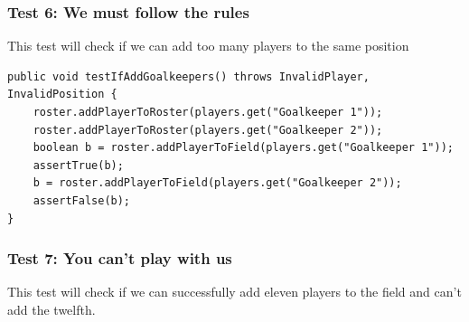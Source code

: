 \documentclass{article}
\begin{document}
\subsubsection{Test 6: We must follow the rules}
This test will check if we can add too many players to the same position
\begin{lstlisting}
public void testIfAddGoalkeepers() throws InvalidPlayer, InvalidPosition {
	roster.addPlayerToRoster(players.get("Goalkeeper 1"));
	roster.addPlayerToRoster(players.get("Goalkeeper 2"));
	boolean b = roster.addPlayerToField(players.get("Goalkeeper 1"));
	assertTrue(b);
	b = roster.addPlayerToField(players.get("Goalkeeper 2"));
	assertFalse(b);
}
\end{lstlisting}

\subsubsection{Test 7: You can't play with us}
This test will check if we can successfully add eleven players to the field and can't add the twelfth.
\end{document}
